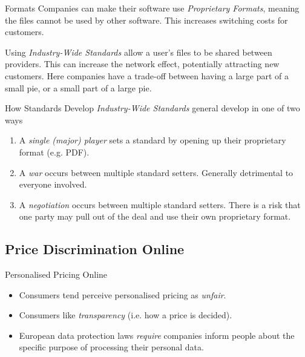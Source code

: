 \documentclass[11pt,a4paper]{article}
\begin{document}
\begin{remark}{Formats}
  Companies can make their software use \textit{Proprietary Formats}, meaning the files cannot be used by other software. This increases switching costs for customers.
  \par Using \textit{Industry-Wide Standards} allow a user's files to be shared between providers. This can increase the network effect, potentially attracting new customers. Here companies have a trade-off between having a large part of a small pie, or a small part of a large pie.
\end{remark}

\begin{remark}{How Standards Develop}
  \textit{Industry-Wide Standards} general develop in one of two ways
  \begin{enumerate}
    \item A \textit{single (major) player} sets a standard by opening up their proprietary format (e.g. PDF).
    \item A \textit{war} occurs between multiple standard setters. Generally detrimental to everyone involved.
    \item A \textit{negotiation} occurs between multiple standard setters. There is a risk that one party may pull out of the deal and use their own proprietary format.
  \end{enumerate}
\end{remark}

\subsection{Price Discrimination Online}

\begin{remark}{Personalised Pricing Online}
  \begin{itemize}
    \item Consumers tend perceive personalised pricing as \textit{unfair}.
    \item Consumers like \textit{transparency} (i.e. how a price is decided).
    \item European data protection laws \textit{require} companies inform people about the specific purpose of processing their personal data.
  \end{itemize}
\end{remark}
\end{document}
